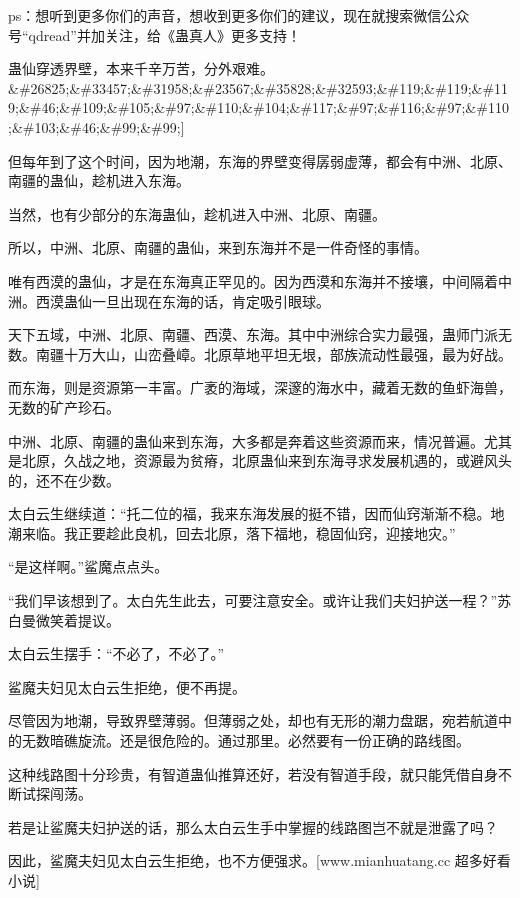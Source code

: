 
\begin{this_body}

ps：想听到更多你们的声音，想收到更多你们的建议，现在就搜索微信公众号“qdread”并加关注，给《蛊真人》更多支持！

蛊仙穿透界壁，本来千辛万苦，分外艰难。\&\#26825;\&\#33457;\&\#31958;\&\#23567;\&\#35828;\&\#32593;\&\#119;\&\#119;\&\#119;\&\#46;\&\#109;\&\#105;\&\#97;\&\#110;\&\#104;\&\#117;\&\#97;\&\#116;\&\#97;\&\#110;\&\#103;\&\#46;\&\#99;\&\#99;]

但每年到了这个时间，因为地潮，东海的界壁变得孱弱虚薄，都会有中洲、北原、南疆的蛊仙，趁机进入东海。

当然，也有少部分的东海蛊仙，趁机进入中洲、北原、南疆。

所以，中洲、北原、南疆的蛊仙，来到东海并不是一件奇怪的事情。

唯有西漠的蛊仙，才是在东海真正罕见的。因为西漠和东海并不接壤，中间隔着中洲。西漠蛊仙一旦出现在东海的话，肯定吸引眼球。

天下五域，中洲、北原、南疆、西漠、东海。其中中洲综合实力最强，蛊师门派无数。南疆十万大山，山峦叠嶂。北原草地平坦无垠，部族流动性最强，最为好战。

而东海，则是资源第一丰富。广袤的海域，深邃的海水中，藏着无数的鱼虾海兽，无数的矿产珍石。

中洲、北原、南疆的蛊仙来到东海，大多都是奔着这些资源而来，情况普遍。尤其是北原，久战之地，资源最为贫瘠，北原蛊仙来到东海寻求发展机遇的，或避风头的，还不在少数。

太白云生继续道：“托二位的福，我来东海发展的挺不错，因而仙窍渐渐不稳。地潮来临。我正要趁此良机，回去北原，落下福地，稳固仙窍，迎接地灾。”

“是这样啊。”鲨魔点点头。

“我们早该想到了。太白先生此去，可要注意安全。或许让我们夫妇护送一程？”苏白曼微笑着提议。

太白云生摆手：“不必了，不必了。”

鲨魔夫妇见太白云生拒绝，便不再提。

尽管因为地潮，导致界壁薄弱。但薄弱之处，却也有无形的潮力盘踞，宛若航道中的无数暗礁旋流。还是很危险的。通过那里。必然要有一份正确的路线图。

这种线路图十分珍贵，有智道蛊仙推算还好，若没有智道手段，就只能凭借自身不断试探闯荡。

若是让鲨魔夫妇护送的话，那么太白云生手中掌握的线路图岂不就是泄露了吗？

因此，鲨魔夫妇见太白云生拒绝，也不方便强求。[www.mianhuatang.cc 超多好看小说]


\end{this_body}
